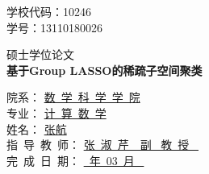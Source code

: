 \documentclass[main]{subfiles}
\begin{document}
\pagestyle{empty}

\begin{flushright}
  {  学校代码：10246{\ \ \ \ \ \ \ \ \ \ \ }\\
  学{\hspace{18pt}}号：13110180026}
\end{flushright}
\vspace{4mm}

\begin{center}
\end{center}
\vspace{4mm}

\begin{center}
  { 硕\quad 士\quad 学\quad 位\quad 论\quad 文}\\
\vspace{2.5cm}
{ \textbf{基于Group LASSO的稀疏子空间聚类}}\\
\vspace{1cm}
\end{center}
\vspace{2cm}

\begin{center}
  {
  院{\hspace{39pt}}系： \underline{\qquad 数\ 学\ 科\ 学\ 学\ 院 \qquad }\\
  \vspace{4mm}
  专{\hspace{39pt}}业： \underline{\qquad\quad 计\ 算\ 数\ 学 \qquad\qquad }\\
  \vspace{4mm}
  姓{\hspace{39pt}}名： \underline{\qquad\qquad 张\qquad 航\qquad\qquad }\\
  \vspace{4mm}
  指\ 导\ 教\ 师： \underline{\qquad 张\ 淑\ 芹\ \ 副 \ 教\ 授 \qquad\ }\\
  \vspace{4mm}
  完\ 成\ 日\ 期： \underline{\qquad{}\ 年\ 03\ 月 \quad\qquad\ }}
\end{center}


\newpage
%
\end{document}
